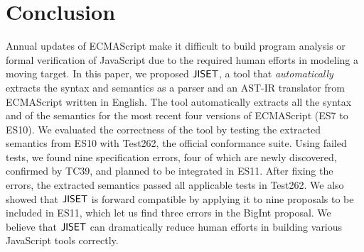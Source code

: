 \section{Conclusion}\label{sec:conclude}
Annual updates of ECMAScript make it difficult to build program
analysis or formal verification of JavaScript due to the required human efforts
in modeling a moving target.  In this paper, we proposed \( \text{\sf JISET} \), a tool
that \textit{automatically} extracts the syntax and semantics as a parser and
an AST-IR translator from ECMAScript written in English.
The tool automatically extracts all the syntax and  of the
semantics for the most recent four versions of ECMAScript (ES7 to ES10).
We evaluated the correctness of the tool by testing the extracted
semantics from ES10 with Test262, the official conformance suite.
Using  failed tests, we found nine specification errors,
four of which are newly discovered, confirmed by TC39, and planned to
be integrated in ES11.  After fixing the errors, the extracted
semantics passed all  applicable tests in Test262.
We also showed that \( \text{\sf JISET} \) is forward compatible by applying it to nine
proposals to be included in ES11, which let us find three errors in the
BigInt proposal.  We believe that \( \text{\sf JISET} \) can dramatically reduce
human efforts in building various JavaScript tools correctly.
